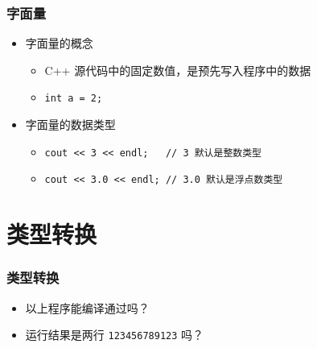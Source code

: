 \begin{frame}[fragile]
    \frametitle{字面量}

    \begin{itemize}
        \item<1-> 字面量的概念

            \begin{itemize}
                \item C++ 源代码中的固定数值，是预先写入程序中的数据
                \item \lstinline|int a = 2;|
            \end{itemize}

        \item<2-> 字面量的数据类型

            \begin{itemize}
                \item \lstinline|cout << 3 << endl;   // 3 默认是整数类型|
                \item \lstinline|cout << 3.0 << endl; // 3.0 默认是浮点数类型|
            \end{itemize}

    \end{itemize}
\end{frame}


\section{类型转换}

\begin{frame}[fragile]
    \frametitle{类型转换}

    

    \begin{itemize}
        \item<2-> 以上程序能编译通过吗？
        \item<2-> 运行结果是两行 \lstinline|123456789123| 吗？
    \end{itemize}
\end{frame}

